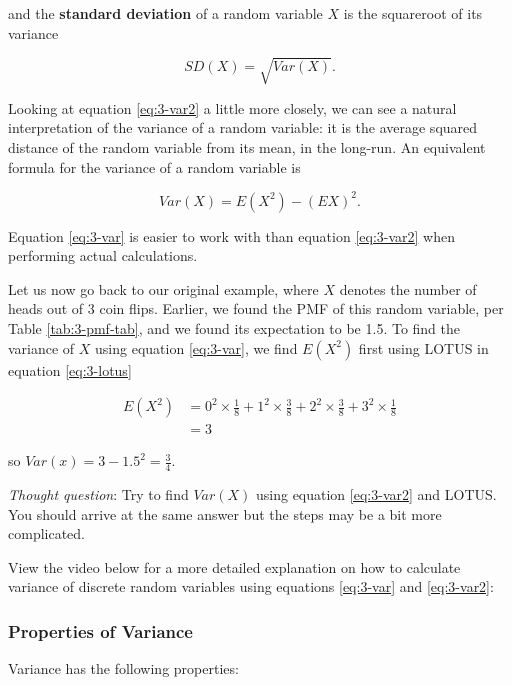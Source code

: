 \documentclass[
]{book}
\begin{document}
and the \textbf{standard deviation} of a random variable \(X\) is the squareroot of its variance

\begin{equation} 
SD(X) = \sqrt{Var(X)}.
\label{eq:3-sd}
\end{equation}

Looking at equation \eqref{eq:3-var2} a little more closely, we can see a natural interpretation of the variance of a random variable: it is the average squared distance of the random variable from its mean, in the long-run. An equivalent formula for the variance of a random variable is

\begin{equation} 
Var(X) = E(X^2) - (EX)^2.
\label{eq:3-var}
\end{equation}

Equation \eqref{eq:3-var} is easier to work with than equation \eqref{eq:3-var2} when performing actual calculations.

Let us now go back to our original example, where \(X\) denotes the number of heads out of 3 coin flips. Earlier, we found the PMF of this random variable, per Table \ref{tab:3-pmf-tab}, and we found its expectation to be 1.5. To find the variance of \(X\) using equation \eqref{eq:3-var}, we find \(E(X^2)\) first using LOTUS in equation \eqref{eq:3-lotus}

\[
\begin{split}
E(X^2) &= 0^2 \times \frac{1}{8} + 1^2 \times \frac{3}{8} + 2^2 \times \frac{3}{8} + 3^2 \times \frac{1}{8} \\
       &= 3
\end{split}
\]

so \(Var(x) = 3 - 1.5^2 = \frac{3}{4}\).

\emph{Thought question}: Try to find \(Var(X)\) using equation \eqref{eq:3-var2} and LOTUS. You should arrive at the same answer but the steps may be a bit more complicated.

View the video below for a more detailed explanation on how to calculate variance of discrete random variables using equations \eqref{eq:3-var} and \eqref{eq:3-var2}:

\subsubsection{Properties of Variance}\label{var-prop}

Variance has the following properties:
\end{document}
